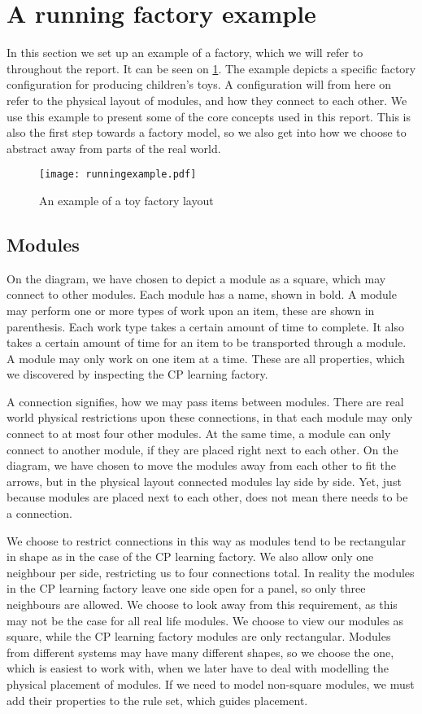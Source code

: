 \section{A running factory example}\label{sec:runningexample}
In this section we set up an example of a factory, which we will refer to throughout the report. It can be seen on \cref{fig:running-example}. The example depicts a specific factory configuration for producing children's toys. A configuration will from here on refer to the physical layout of modules, and how they connect to each other. We use this example to present some of the core concepts used in this report. This is also the first step towards a factory model, so we also get into how we choose to abstract away from parts of the real world. 

\begin{figure}[h]
\centering
\texttt{[image: runningexample.pdf]}
\caption{An example of a toy factory layout}
\label{fig:running-example}
\end{figure}

\subsection{Modules}
On the diagram, we have chosen to depict a module as a square, which may connect to other modules. Each module has a name, shown in bold. A module may perform one or more types of work  upon an item, these are shown in parenthesis. Each work type takes a certain amount of time to complete. It also takes a certain amount of time for an item to be transported through a module. A module may only work on one item at a time. These are all properties, which we discovered by inspecting the CP learning factory.

A connection signifies, how we may pass items between modules. There are real world physical restrictions upon these connections, in that each module may only connect to at most four other modules. At the same time, a module can only connect to another module, if they are placed right next to each other. On the diagram, we have chosen to move the modules away from each other to fit the arrows, but in the physical layout connected modules lay side by side. Yet, just because modules are placed next to each other, does not mean there needs to be a connection.

We choose to restrict connections in this way as modules tend to be rectangular in shape as in the case of the CP learning factory. We also allow only one neighbour per side, restricting us to four connections total. In reality the modules in the CP learning factory leave one side open for a panel, so only three neighbours are allowed. We choose to look away from this requirement, as this may not be the case for all real life modules. We choose to view our modules as square, while the CP learning factory modules are only rectangular. Modules from different systems may have many different shapes, so we choose the one, which is easiest to work with, when we later have to deal with modelling the physical placement of modules. If we need to model non-square modules, we must add their properties to the rule set, which guides placement. 

